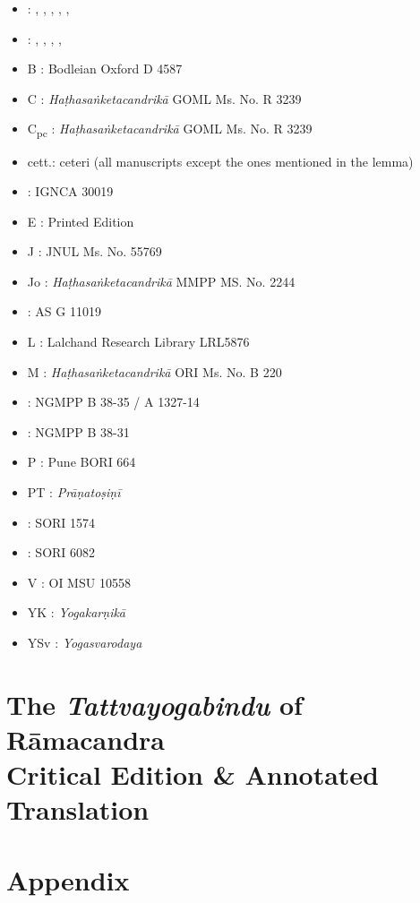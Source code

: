 \begin{itemize}
\item \beta : , , , , , 
\item \gamma : , , , , 
\item B : Bodleian Oxford D 4587
\item C : \emph{Haṭhasaṅketacandrikā} GOML Ms. No. R 3239
\item C\textsubscript{pc} : \emph{Haṭhasaṅketacandrikā} GOML Ms. No. R 3239
\item cett.: ceteri (all manuscripts except the ones mentioned in the lemma)
\item \Done : IGNCA 30019
\item E : Printed Edition
\item J : JNUL Ms. No. 55769
\item Jo : \emph{Haṭhasaṅketacandrikā} MMPP MS. No. 2244
\item \Kone : AS G 11019
\item L : Lalchand Research Library LRL5876
\item M : \emph{Haṭhasaṅketacandrikā} ORI Ms. No. B 220
\item \Ntwo : NGMPP B 38-35 / A 1327-14
\item \None : NGMPP B 38-31
\item P : Pune BORI 664
\item PT : \emph{Prāṇatoṣiṇī}
\item \Uone : SORI 1574
\item \Utwo : SORI 6082
\item V : OI MSU 10558
\item YK : \emph{Yogakarṇikā}%
\item YSv : \emph{Yogasvarodaya}
\end{itemize}
\newpage

\chapter[Critical Edition \& Annotated Translation of the \emph{Tattvayogabindu}]{The \emph{Tattvayogabindu} of Rāmacandra \\ \huge  
  Critical Edition \& Annotated Translation}
\pagestyle{chapter2style}
\newpage

\cleardoublepage
{}
\chapter{Appendix}
